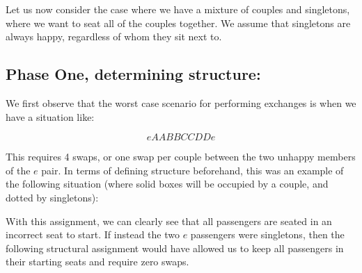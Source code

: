Let us now consider the case where we have a mixture of couples and singletons, where we want to seat all of the couples together. We assume that singletons are always happy, regardless of whom they sit next to.

\subsection{Phase One, determining structure:} 

We first observe that the worst case scenario for performing exchanges is when we have a situation like:

\begin{equation*}
eAABBCCDDe
\end{equation*}

This requires 4 swaps, or one swap per couple between the two unhappy members of the $e$ pair.  In terms of defining structure beforehand, this was an example of the following situation (where solid boxes will be occupied by a couple, and dotted by singletons):

\begin{figure}[H]
\centering
{}
\end{figure}

With this assignment, we can clearly see that all passengers are seated in an incorrect seat to start. If instead the two $e$ passengers were singletons, then the following structural assignment would have allowed us to keep all passengers in their starting seats and require zero swaps.

\begin{figure}[H]
\centering
{}
\end{figure}


